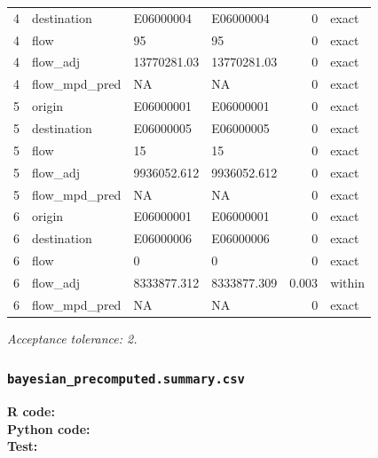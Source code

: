 \documentclass[10pt]{article}
\begin{document}
\begin{longtable}{@{}r p{}p{}p{}rl@{}}
4 & destination & E06000004 & E06000004 & 0 & exact \\
4 & flow & 95 & 95 & 0 & exact \\
4 & flow\_\allowbreak{}adj & 13770281.03 & 13770281.03 & 0 & exact \\
4 & flow\_\allowbreak{}mpd\_\allowbreak{}pred & NA & NA & 0 & exact \\
5 & origin & E06000001 & E06000001 & 0 & exact \\
5 & destination & E06000005 & E06000005 & 0 & exact \\
5 & flow & 15 & 15 & 0 & exact \\
5 & flow\_\allowbreak{}adj & 9936052.612 & 9936052.612 & 0 & exact \\
5 & flow\_\allowbreak{}mpd\_\allowbreak{}pred & NA & NA & 0 & exact \\
6 & origin & E06000001 & E06000001 & 0 & exact \\
6 & destination & E06000006 & E06000006 & 0 & exact \\
6 & flow & 0 & 0 & 0 & exact \\
6 & flow\_\allowbreak{}adj & 8333877.312 & 8333877.309 & \num{0.003} & within \\
6 & flow\_\allowbreak{}mpd\_\allowbreak{}pred & NA & NA & 0 & exact \\
\bottomrule
\end{longtable}
\normalsize
\textit{Acceptance tolerance: \num{2}.}

\subsubsection{\texorpdfstring{\texttt{bayesian\_precomputed.summary.csv}}{bayesian\_precomputed.summary.csv}}
{\footnotesize \textbf{R code:} \\ \textbf{Python code:} \\ \textbf{Test:} \par}
\end{document}
